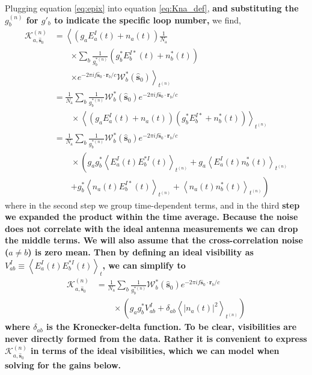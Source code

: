 \documentclass[a4paper,fleqn,usenatbib]{../mnras}
\newcommand{\Nant}{\ensuremath{N_{\mathrm{a}}}}
\newcommand{\spix}{\ensuremath{\hat{\mathbf{s}}_{0}}}
\newcommand{\Kna}[1][n]{\ensuremath{\mathcal{K}^{(#1)}_{a,\spix}}}
\newcommand{\rb}{\ensuremath{\mathbf{r}_b}}
\begin{document}
Plugging equation \ref{eq:epix} into equation \ref{eq:Kna_def}, 
\textbf{and substituting the $g^{(n)}_b$ for $g'_b$ to indicate the specific loop number,}
we find,
\begin{align}
\Kna & = \left<\left(g_a E_a^I(t)+n_a(t)\right) \frac{1}{\Nant} \right. \nonumber \\
& \qquad \left. \times \sum_b \frac{1}{g^{*(n)}_b}\left(g^*_bE_b^{I*}(t)+n^*_b(t)\right) \right.\nonumber \\
& \qquad \left. \times e^{-2\pi i f\spix \cdot \rb/c} \mathcal{W}^*_b(\spix)\right>_{t^{(n)}} \nonumber \\
& = \frac{1}{\Nant} \sum_b \frac{1}{g^{*(n)}_b} \mathcal{W}^*_b(\spix) e^{-2\pi i f\spix \cdot \rb/c} \nonumber \\
& \qquad \times \left<\left(g_aE_a^I(t)+n_a(t)\right)\left(g^*_bE_b^{I*}+n^*_b(t)\right) \right>_{t^{(n)}} \nonumber \\
& = \frac{1}{\Nant} \sum_b \frac{1}{g^{*(n)}_b} \mathcal{W}^*_b(\spix) e^{-2\pi i f\spix \cdot \rb/c} \nonumber \\
& \qquad \times \left(g_a g^*_b \left<E^I_a(t)E^{*I}_b(t)\right>_{t^{(n)}} + g_a\left<E_a^I(t)n^*_b(t)\right>_{t^{(n)}} \right. \nonumber \\
& \qquad \left. + g^*_b\left<n_a(t)E^{I*}_b(t)\right>_{t^{(n)}} + \left<n_a(t) n^*_b(t)\right>_{t^{(n)}}\right)  
\end{align}
where in the second step we group time-dependent terms, 
and in the third \textbf{step we expanded the product within the time average.
Because the noise does not correlate with the ideal antenna measurements we can
drop the middle terms. We will also assume that the cross-correlation noise ($a\ne b$) 
is zero mean. Then by defining an ideal visibility as
$V_{ab}^I \equiv \left<E^I_a(t)E^{*I}_b(t)\right>_t$, we can simplify to}
\begin{align}\label{eq:Kna}
\Kna & = \frac{1}{\Nant} \sum_b \frac{1}{g^{*(n)}_b} \mathcal{W}^*_b(\spix) e^{-2\pi i f\spix \cdot \rb/c}\nonumber \\
& \qquad \times \left( g_ag_b^* V_{ab}^I + \delta_{ab}\left<|n_a(t)|^2\right>_{t^{(n)}}\right)
\end{align}
\textbf{where $\delta_{ab}$ is the Kronecker-delta function. To be clear, visibilities are never directly 
formed from the data. Rather it is convenient to express $\Kna$ in terms of the ideal 
visibilities, which we can model when solving for the gains below.}
\end{document}
